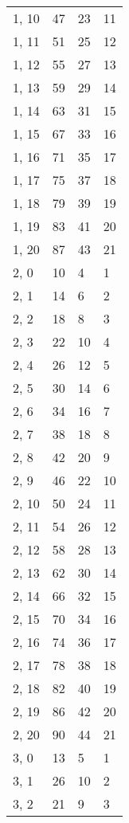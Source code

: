 \begin{table}
\begin{tabular}{llll}
1, 10  &      47 &   23 &    11 \\
1, 11  &      51 &   25 &    12 \\
1, 12  &      55 &   27 &    13 \\
1, 13  &      59 &   29 &    14 \\
1, 14  &      63 &   31 &    15 \\
1, 15  &      67 &   33 &    16 \\
1, 16  &      71 &   35 &    17 \\
1, 17  &      75 &   37 &    18 \\
1, 18  &      79 &   39 &    19 \\
1, 19  &      83 &   41 &    20 \\
1, 20  &      87 &   43 &    21 \\
2, 0   &      10 &    4 &     1 \\
2, 1   &      14 &    6 &     2 \\
2, 2   &      18 &    8 &     3 \\
2, 3   &      22 &   10 &     4 \\
2, 4   &      26 &   12 &     5 \\
2, 5   &      30 &   14 &     6 \\
2, 6   &      34 &   16 &     7 \\
2, 7   &      38 &   18 &     8 \\
2, 8   &      42 &   20 &     9 \\
2, 9   &      46 &   22 &    10 \\
2, 10  &      50 &   24 &    11 \\
2, 11  &      54 &   26 &    12 \\
2, 12  &      58 &   28 &    13 \\
2, 13  &      62 &   30 &    14 \\
2, 14  &      66 &   32 &    15 \\
2, 15  &      70 &   34 &    16 \\
2, 16  &      74 &   36 &    17 \\
2, 17  &      78 &   38 &    18 \\
2, 18  &      82 &   40 &    19 \\
2, 19  &      86 &   42 &    20 \\
2, 20  &      90 &   44 &    21 \\
3, 0   &      13 &    5 &     1 \\
3, 1   &      26 &   10 &     2 \\
3, 2   &      21 &    9 &     3 \\

\end{tabular}
\end{table}
